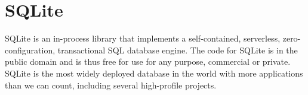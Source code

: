\section{SQLite}
SQLite\cite{www-sqlite} is an in-process library that implements a self-contained, serverless,
zero-configuration, transactional SQL database engine. The code for SQLite is
in the public domain and is thus free for use for any purpose, commercial or
private. SQLite is the most widely deployed database in the world with more
applications than we can count, including several high-profile projects.
